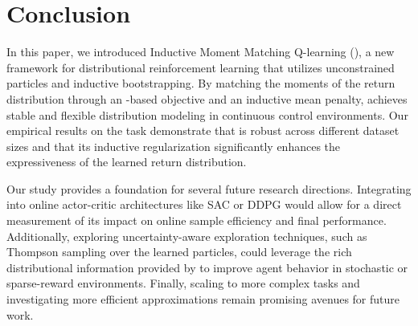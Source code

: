 \section{Conclusion}

In this paper, we introduced Inductive Moment Matching Q-learning (\immq), a new framework for distributional reinforcement learning that utilizes unconstrained particles and inductive bootstrapping. By matching the moments of the return distribution through an \mmd-based objective and an inductive mean penalty, \immq achieves stable and flexible distribution modeling in continuous control environments. Our empirical results on the \halfcheetah task demonstrate that \immq is robust across different dataset sizes and that its inductive regularization significantly enhances the expressiveness of the learned return distribution.

Our study provides a foundation for several future research directions. Integrating \immq into online actor-critic architectures like SAC or DDPG would allow for a direct measurement of its impact on online sample efficiency and final performance. Additionally, exploring uncertainty-aware exploration techniques, such as Thompson sampling over the learned particles, could leverage the rich distributional information provided by \immq to improve agent behavior in stochastic or sparse-reward environments. Finally, scaling \immq to more complex tasks and investigating more efficient \mmd approximations remain promising avenues for future work.
